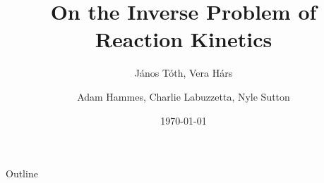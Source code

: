 \documentclass[11pt]{beamer}
\title{On the Inverse Problem of Reaction Kinetics}
\subtitle{J{\'a}nos T{\'o}th, Vera H{\'a}rs}
\author{Adam Hammes, Charlie Labuzzetta, Nyle Sutton}
\institute{Iowa State University}
\date{\today}
\begin{document}
	
	\begin{frame}
		\titlepage
	\end{frame}
	
	\begin{frame}{Outline}
		\tableofcontents
	\end{frame}
	
	
	
	
	
	
	
\end{document}
